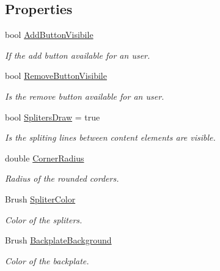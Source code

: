 \subsection*{Properties}
\begin{DoxyCompactItemize}
\item 
bool \mbox{\hyperlink{class_wpf_handler_1_1_u_i_1_1_controls_1_1_auto_collection_a5b53cdaeabbf4958eb0391475f060771}{Add\+Button\+Visibile}}
\begin{DoxyCompactList}\small\item\em If the add button available for an user. \end{DoxyCompactList}\item 
bool \mbox{\hyperlink{class_wpf_handler_1_1_u_i_1_1_controls_1_1_auto_collection_af64aaec7162358b87294c5b7f77c8e54}{Remove\+Button\+Visibile}}
\begin{DoxyCompactList}\small\item\em Is the remove button available for an user. \end{DoxyCompactList}\item 
bool \mbox{\hyperlink{class_wpf_handler_1_1_u_i_1_1_controls_1_1_auto_collection_a78b75144a4f57f1ec4d6027388afbd5d}{Spliters\+Draw}} = true
\begin{DoxyCompactList}\small\item\em Is the spliting lines between content elements are visible. \end{DoxyCompactList}\item 
double \mbox{\hyperlink{class_wpf_handler_1_1_u_i_1_1_controls_1_1_auto_collection_a0a78d9c621857e9a61e19cba5001589d}{Corner\+Radius}}
\begin{DoxyCompactList}\small\item\em Radius of the rounded corders. \end{DoxyCompactList}\item 
Brush \mbox{\hyperlink{class_wpf_handler_1_1_u_i_1_1_controls_1_1_auto_collection_a9234690dcc653145332286c86afa4904}{Spliter\+Color}}
\begin{DoxyCompactList}\small\item\em Color of the spliters. \end{DoxyCompactList}\item 
Brush \mbox{\hyperlink{class_wpf_handler_1_1_u_i_1_1_controls_1_1_auto_collection_af74226c7fb905acd0a3040ba4b677713}{Backplate\+Background}}
\begin{DoxyCompactList}\small\item\em Color of the backplate. \end{DoxyCompactList}\end{DoxyCompactItemize}
